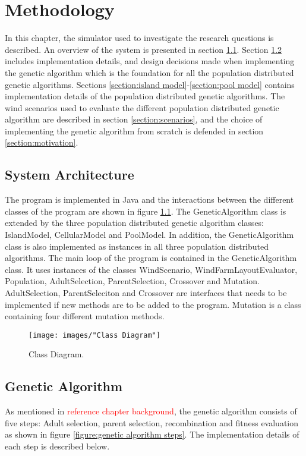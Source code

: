 \chapter{Methodology}\label{chapter:methodology}%
In this chapter, the simulator used to investigate the research questions is described. An overview of the system is presented in section \ref{section:systemt architecture}. Section \ref{section:genetic algorithm} includes implementation details, and design decisions made when implementing the genetic algorithm which is the foundation for all the population distributed genetic algorithms. Sections \ref{section:island model}-\ref{section:pool model} contains implementation details of the population distributed genetic algorithms. The wind scenarios used to evaluate the different population distributed genetic algorithm are described in section \ref{section:scenarios}, and the choice of implementing the genetic algorithm from scratch is defended in section \ref{section:motivation}.


\section{System Architecture}\label{section:systemt architecture}
The program is implemented in Java and the interactions between the different classes of the program are shown in figure \ref{figure:class diagram}. The GeneticAlgorithm class is extended by the three population distributed genetic algorithm classes: IslandModel, CellularModel and PoolModel. In addition, the GeneticAlgorithm class is also implemented as instances in all three population distributed algorithms. The main loop of the program is contained in the GeneticAlgorithm class. It uses instances of the classes WindScenario, WindFarmLayoutEvaluator, Population, AdultSelection, ParentSelection, Crossover and Mutation. AdultSelection, ParentSeleciton and Crossover are interfaces that needs to be implemented if new methods are to be added to the program. Mutation is a class containing four different mutation methods. 


\begin{figure}[h!]
\begin{center}
\texttt{[image: images/"Class Diagram"]}
\caption{Class Diagram.}
\label{figure:class diagram}
\end{center}
\end{figure}


\section{Genetic Algorithm}\label{section:genetic algorithm}
As mentioned in \textcolor{red}{reference chapter background}, the genetic algorithm consists of five steps: Adult selection, parent selection, recombination and fitness evaluation as shown in figure \ref{figure:genetic algorithm steps}. The implementation details of each step is described below.


